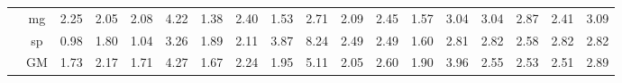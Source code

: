 \begin{table*}[]
\begin{center}
{\begin{tabular}{|c|c|rrrr|rrrr|rrrr|rrrr|}
 &  mg  &  2.25  & \cellcolor{blue!25} 2.05  &  2.08  &   4.22  &  1.38  &  2.40  & \cellcolor{blue!25} 1.53  &  2.71  &  2.09  &  2.45  & \cellcolor{blue!25} 1.57  &  3.04  &  3.04  & \cellcolor{blue!25} 2.87  & \cellcolor{blue!25} 2.41  &  3.09 \\
 &  sp  &  0.98  &  1.80  & \cellcolor{blue!25} 1.04  &   3.26  &  1.89  &  2.11  &  3.87  &  8.24  &  2.49  &  2.49  & \cellcolor{blue!25} 1.60  &  2.81  &  2.82  & \cellcolor{blue!25} 2.58  &  2.82  &  2.82 \\ \cline{2-18}
 &  GM  &  1.73  &  2.17  & \cellcolor{blue!25} 1.71  &   4.27  &  1.67  &  2.24  & \cellcolor{blue!25} 1.95  &  5.11  &  2.05  &  2.60  & \cellcolor{blue!25} 1.90  &  3.96  &  2.55  & \cellcolor{blue!25} 2.53  & \cellcolor{blue!25} 2.51  &  2.89 \\
\hline 
\end{tabular} }

\end{center}
\end{table*}
